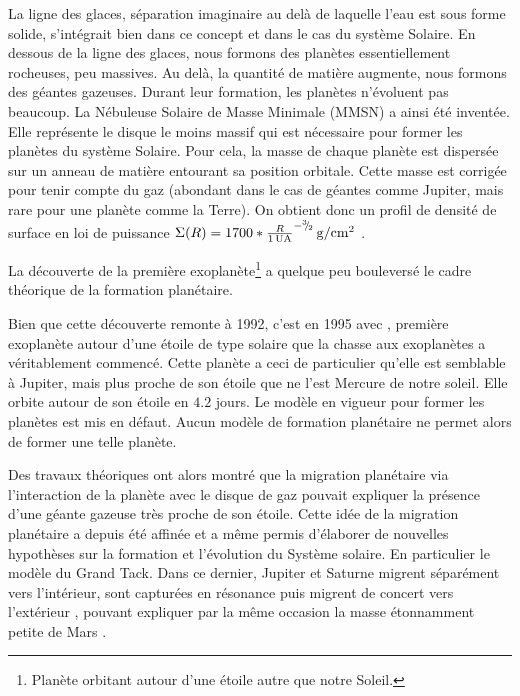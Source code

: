 La ligne des glaces, séparation imaginaire au delà de laquelle l'eau est sous forme solide, s'intégrait bien dans ce concept et
dans le cas du système Solaire. En dessous de la ligne des glaces, nous formons des planètes essentiellement rocheuses, peu
massives. Au delà, la quantité de matière augmente, nous formons des géantes gazeuses. Durant leur formation, les planètes
n'évoluent pas beaucoup. La Nébuleuse Solaire de Masse Minimale (MMSN) a ainsi été inventée. Elle représente le disque le moins
massif qui est nécessaire pour former les planètes du système Solaire. Pour cela, la masse de chaque planète est dispersée
sur un anneau de matière entourant sa position orbitale.
Cette masse est corrigée pour tenir compte du gaz (abondant dans le cas de géantes comme Jupiter, mais rare pour une planète
comme la Terre). On obtient donc un profil de densité de surface en loi de puissance $\Sigma(R)=1700 * \frac{R}{1\mathrm{\thinspace UA}}^{-{{}^{3\!\!}/ _{\!2}}}\mathrm{\thinspace g/cm^2}$ \citep{
weidenschilling1977distribution, hayashi1981structure}.

La découverte de la première exoplanète\footnote{Planète orbitant autour d'une étoile autre que notre Soleil.}
\citep{wolszczan1992planetary} a quelque peu bouleversé le cadre théorique de la formation planétaire.

Bien que cette découverte remonte à 1992, c'est en 1995 avec  \citep{mayor1995jupiter}, première exoplanète autour d'une étoile de type solaire que la chasse aux
exoplanètes a véritablement commencé. Cette planète a ceci de particulier qu'elle est semblable à Jupiter, mais plus proche de
son étoile que ne l'est Mercure de notre soleil. Elle orbite autour de son étoile en $4.2$ jours. Le modèle en
vigueur pour former les planètes est mis en défaut. Aucun modèle de formation planétaire ne permet alors de former une telle
planète. 

Des travaux théoriques ont alors montré que la migration planétaire via l'interaction de la planète avec le disque de gaz
pouvait expliquer la présence d'une géante gazeuse très proche de son étoile. Cette idée de la migration planétaire a depuis été
affinée et a même permis d'élaborer de nouvelles hypothèses sur la formation et l'évolution du Système solaire. En particulier
le modèle du \og Grand Tack\fg \citep{walsh2011low}. Dans ce dernier, Jupiter et
Saturne migrent séparément vers l'intérieur, sont capturées en résonance puis migrent de concert vers l'extérieur
\citep{morbidelli2007dynamics, pierens2011twophase}, pouvant
expliquer par la même occasion la masse étonnamment petite de Mars \citep{walsh2011low}. 

